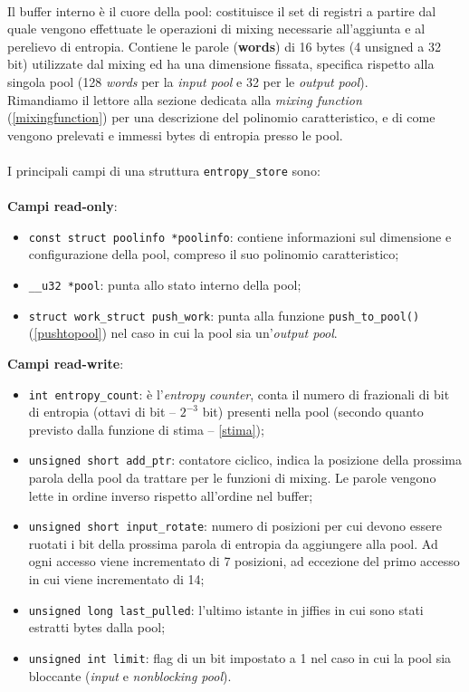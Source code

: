 \documentclass{article}
\begin{document}
 \paragraph{}Il buffer interno è il cuore della pool: costituisce il set di 
 registri a partire dal quale vengono effettuate le operazioni di mixing necessarie
 all'aggiunta e al perelievo di entropia. Contiene le parole (\textbf{words}) di
 16 bytes (4 unsigned a 32 bit) utilizzate dal mixing ed ha una dimensione fissata,
 specifica rispetto alla singola pool (128 \emph{words} per la \emph{input pool} e 32 per
 le \emph{output pool}). \\
 Rimandiamo il lettore alla sezione dedicata alla \emph{mixing function}
 (\ref{mixingfunction}) per una descrizione del polinomio caratteristico, e di
 come vengono prelevati e immessi bytes di entropia presso le pool.
 
 \paragraph{}I principali campi di una struttura \verb+entropy_store+ sono:\\\\
 \textbf{Campi read-only}:
 \begin{itemize}
	   \item \verb+const struct poolinfo *poolinfo+: contiene informazioni
	   sul dimensione e configurazione della pool, compreso il suo polinomio
	   caratteristico;
	   \item \verb+__u32 *pool+: punta allo stato interno della pool;
	   \item \verb+struct work_struct push_work+: punta alla funzione \verb+push_to_pool()+ 
	   (\ref{pushtopool}) nel caso in cui la pool sia un'\emph{output
	   pool}.
	 \end{itemize}
 \noindent \textbf{Campi read-write}:
 \begin{itemize}
   \item \verb+int entropy_count+: è l'\emph{entropy counter}, conta il
   numero di frazionali di bit di entropia (ottavi di 
   bit -- $2^{-3}$ bit) presenti nella pool (secondo quanto previsto dalla
   funzione di stima -- \ref{stima});
   \item \verb+unsigned short add_ptr+: contatore ciclico, indica la posizione
   della prossima parola della pool da trattare per le funzioni di mixing. 
   Le parole vengono lette in ordine inverso rispetto all'ordine nel buffer;
   \item \verb+unsigned short input_rotate+: numero di posizioni per cui devono
   essere ruotati i bit della prossima parola di entropia da aggiungere alla
   pool. Ad ogni accesso viene incrementato di 7 posizioni, ad eccezione del
   primo accesso in cui viene incrementato di 14;
   \item \verb+unsigned long last_pulled+: l'ultimo istante in jiffies in cui
   sono stati estratti bytes dalla pool;
   \item \verb+unsigned int limit+: flag di un bit impostato a 1 nel caso in
   cui la pool sia bloccante (\emph{input} e \emph{nonblocking pool}).
 \end{itemize}    
  
\end{document}
